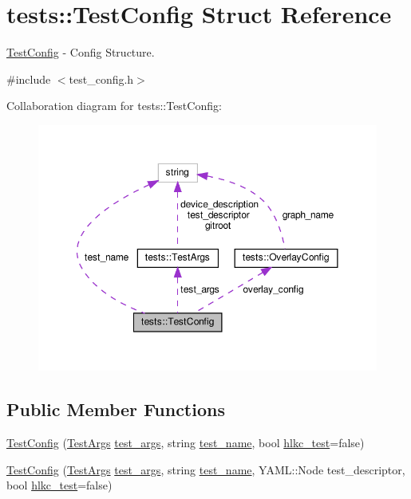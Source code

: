 \hypertarget{structtests_1_1TestConfig}{}\section{tests\+:\+:Test\+Config Struct Reference}
\label{structtests_1_1TestConfig}


\hyperlink{structtests_1_1TestConfig}{Test\+Config} -\/ Config Structure.  




{\ttfamily \#include $<$test\+\_\+config.\+h$>$}



Collaboration diagram for tests\+:\+:Test\+Config\+:\nopagebreak
\begin{figure}[H]
\begin{center}
\leavevmode
\includegraphics[width=350pt]{structtests_1_1TestConfig__coll__graph}
\end{center}
\end{figure}
\subsection*{Public Member Functions}
\begin{DoxyCompactItemize}
\item 
\hyperlink{structtests_1_1TestConfig_a32eac564ba880bb65d318e8f78de756b}{Test\+Config} (\hyperlink{structtests_1_1TestArgs}{Test\+Args} \hyperlink{structtests_1_1TestConfig_aa030c4b4c3fb91e5d6ac2524d408e727}{test\+\_\+args}, string \hyperlink{structtests_1_1TestConfig_aee3a781ac75f698787b6fcd81ca060bb}{test\+\_\+name}, bool \hyperlink{structtests_1_1TestConfig_ad3c14921521c690e03ab5664a69d9efc}{hlkc\+\_\+test}=false)
\item 
\hyperlink{structtests_1_1TestConfig_a169c374c99e645ce36d61113397220a0}{Test\+Config} (\hyperlink{structtests_1_1TestArgs}{Test\+Args} \hyperlink{structtests_1_1TestConfig_aa030c4b4c3fb91e5d6ac2524d408e727}{test\+\_\+args}, string \hyperlink{structtests_1_1TestConfig_aee3a781ac75f698787b6fcd81ca060bb}{test\+\_\+name}, Y\+A\+M\+L\+::\+Node test\+\_\+descriptor, bool \hyperlink{structtests_1_1TestConfig_ad3c14921521c690e03ab5664a69d9efc}{hlkc\+\_\+test}=false)
\end{DoxyCompactItemize}
